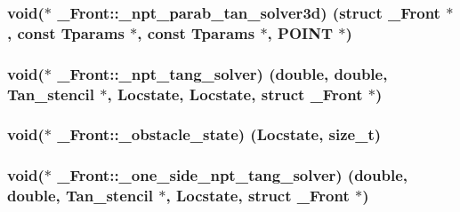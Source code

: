 \subsubsection[{\texorpdfstring{\+\_\+npt\+\_\+parab\+\_\+tan\+\_\+solver3d}{_npt_parab_tan_solver3d}}]{\setlength{\rightskip}{0pt plus 5cm}void($\ast$ \+\_\+\+Front\+::\+\_\+npt\+\_\+parab\+\_\+tan\+\_\+solver3d) (struct {\bf \+\_\+\+Front} $\ast$, const {\bf Tparams} $\ast$, const {\bf Tparams} $\ast$, {\bf P\+O\+I\+NT} $\ast$)}\hypertarget{struct___front_a89179affcf68c2ebe29c353391ff72bd}{}\label{struct___front_a89179affcf68c2ebe29c353391ff72bd}
\subsubsection[{\texorpdfstring{\+\_\+npt\+\_\+tang\+\_\+solver}{_npt_tang_solver}}]{\setlength{\rightskip}{0pt plus 5cm}void($\ast$ \+\_\+\+Front\+::\+\_\+npt\+\_\+tang\+\_\+solver) (double, double, {\bf Tan\+\_\+stencil} $\ast$, {\bf Locstate}, {\bf Locstate}, struct {\bf \+\_\+\+Front} $\ast$)}\hypertarget{struct___front_a093205e13f21c14a21795638d9ef89c0}{}\label{struct___front_a093205e13f21c14a21795638d9ef89c0}
\subsubsection[{\texorpdfstring{\+\_\+obstacle\+\_\+state}{_obstacle_state}}]{\setlength{\rightskip}{0pt plus 5cm}void($\ast$ \+\_\+\+Front\+::\+\_\+obstacle\+\_\+state) ({\bf Locstate}, size\+\_\+t)}\hypertarget{struct___front_a8640443dc59349205984ce881d5f2f66}{}\label{struct___front_a8640443dc59349205984ce881d5f2f66}
\subsubsection[{\texorpdfstring{\+\_\+one\+\_\+side\+\_\+npt\+\_\+tang\+\_\+solver}{_one_side_npt_tang_solver}}]{\setlength{\rightskip}{0pt plus 5cm}void($\ast$ \+\_\+\+Front\+::\+\_\+one\+\_\+side\+\_\+npt\+\_\+tang\+\_\+solver) (double, double, {\bf Tan\+\_\+stencil} $\ast$, {\bf Locstate}, struct {\bf \+\_\+\+Front} $\ast$)}\hypertarget{struct___front_aacf67ecc49cef8e3cc295a21a048db8a}{}\label{struct___front_aacf67ecc49cef8e3cc295a21a048db8a}
